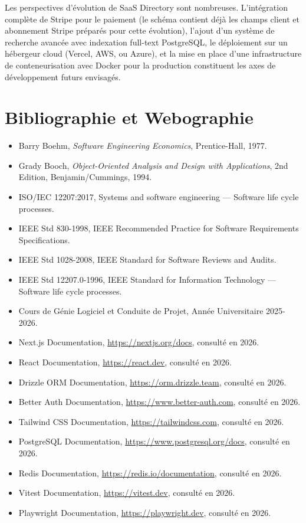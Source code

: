 \documentclass[12pt,a4paper]{article}
\begin{document}
Les perspectives d'évolution de SaaS Directory sont nombreuses. L'intégration complète de Stripe pour le paiement (le schéma contient déjà les champs client et abonnement Stripe préparés pour cette évolution), l'ajout d'un système de recherche avancée avec indexation full-text PostgreSQL, le déploiement sur un hébergeur cloud (Vercel, AWS, ou Azure), et la mise en place d'une infrastructure de conteneurisation avec Docker pour la production constituent les axes de développement futurs envisagés.
\newpage

\section*{Bibliographie et Webographie}

\begin{itemize}[leftmargin=1.5em]
\item Barry Boehm, \textit{Software Engineering Economics}, Prentice-Hall, 1977.
\item Grady Booch, \textit{Object-Oriented Analysis and Design with Applications}, 2nd Edition, Benjamin/Cummings, 1994.
\item ISO/IEC 12207:2017, Systems and software engineering --- Software life cycle processes.
\item IEEE Std 830-1998, IEEE Recommended Practice for Software Requirements Specifications.
\item IEEE Std 1028-2008, IEEE Standard for Software Reviews and Audits.
\item IEEE Std 12207.0-1996, IEEE Standard for Information Technology --- Software life cycle processes.
\item Cours de Génie Logiciel et Conduite de Projet, Année Universitaire 2025-2026.
\item Next.js Documentation, \url{https://nextjs.org/docs}, consulté en 2026.
\item React Documentation, \url{https://react.dev}, consulté en 2026.
\item Drizzle ORM Documentation, \url{https://orm.drizzle.team}, consulté en 2026.
\item Better Auth Documentation, \url{https://www.better-auth.com}, consulté en 2026.
\item Tailwind CSS Documentation, \url{https://tailwindcss.com}, consulté en 2026.
\item PostgreSQL Documentation, \url{https://www.postgresql.org/docs}, consulté en 2026.
\item Redis Documentation, \url{https://redis.io/documentation}, consulté en 2026.
\item Vitest Documentation, \url{https://vitest.dev}, consulté en 2026.
\item Playwright Documentation, \url{https://playwright.dev}, consulté en 2026.
\end{itemize}
\newpage


\end{document}
